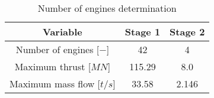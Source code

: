 
\begin{table}[H]
    \centering
    \caption{Number of engines determination}
    \begin{tabular}{|c|c|c|}
        \hline
         Variable & Stage 1 & Stage 2 \\ \hline
         Number of engines [$-$] & 42 & 4 \\
         Maximum thrust [$MN$] & 115.29 & 8.0 \\
         Maximum mass flow [$t/s$] & 33.58 & 2.146 \\  
         \hline
    \end{tabular}
    \label{tab:n_e_results}
\end{table}